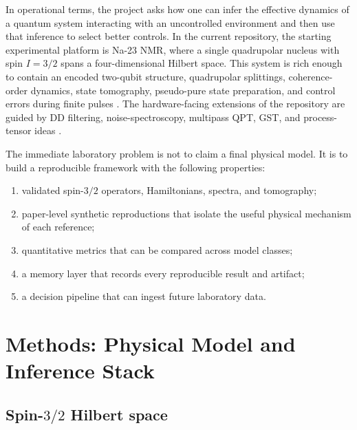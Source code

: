 \documentclass[11pt,a4paper]{article}
\begin{document}
In operational terms, the project asks how one can infer the effective dynamics
of a quantum system interacting with an uncontrolled environment and then use
that inference to select better controls.  In the current repository, the
starting experimental platform is Na-23 NMR, where a single quadrupolar nucleus
with spin $I=3/2$ spans a four-dimensional Hilbert space.  This system is rich
enough to contain an encoded two-qubit structure, quadrupolar splittings,
coherence-order dynamics, state tomography, pseudo-pure state preparation, and
control errors during finite pulses
\citep{spin32_algebraic_2004,qst_relaxation_2008,spin32_qlogic_qst_2005,
quadrupolar_qip_2012,grape_nmr_control_2005,pps_optimal_control_2012}.  The
hardware-facing extensions of the repository are guided by DD filtering,
noise-spectroscopy, multipass QPT, GST, and process-tensor ideas
\citep{noise_filtering_control_2014,dd_noise_spectroscopy_2011,
flux_qubit_noise_spectroscopy_2011,multipass_qpt_2024,
projected_ls_qpt_2022,gate_set_tomography_2021,
nonmarkov_process_tensor_2020,nonmarkov_noise_2022}.

The immediate laboratory problem is not to claim a final physical model.  It is
to build a reproducible framework with the following properties:
\begin{enumerate}
  \item validated spin-$3/2$ operators, Hamiltonians, spectra, and tomography;
  \item paper-level synthetic reproductions that isolate the useful physical
  mechanism of each reference;
  \item quantitative metrics that can be compared across model classes;
  \item a memory layer that records every reproducible result and artifact;
  \item a decision pipeline that can ingest future laboratory data.
\end{enumerate}

\section{Methods: Physical Model and Inference Stack}

\subsection{Spin-$3/2$ Hilbert space}
\end{document}
